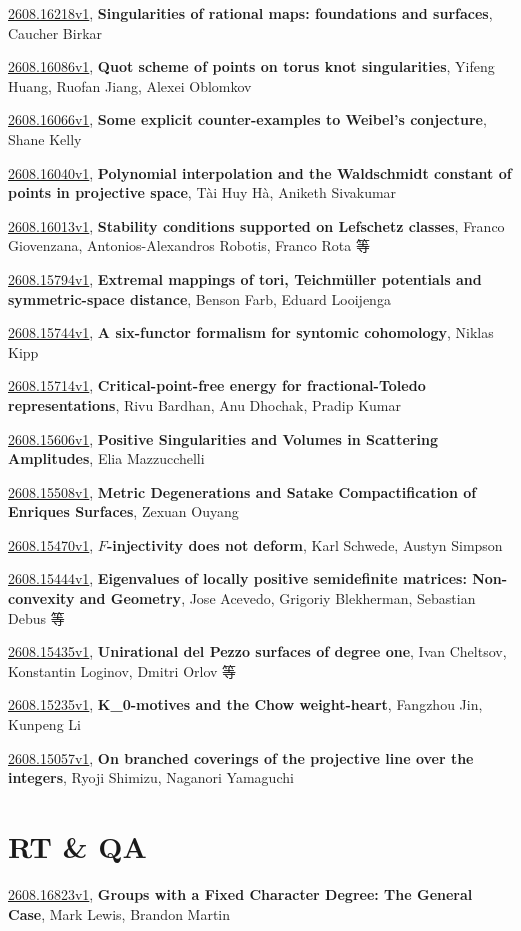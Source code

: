 \documentclass[9pt, a4paper]{article}
\theoremstyle{plain}
\theoremstyle{definition}
\theoremstyle{remark}
\newcommand{\arxiv}[3]{\href{https://arxiv.org/abs/#1}{#1}, \textbf{\textcolor{arxivblue}{#2}}, #3}
\begin{document}
\arxiv{2608.16218v1}{Singularities of rational maps: foundations and surfaces}{Caucher Birkar}

\arxiv{2608.16086v1}{Quot scheme of points on torus knot singularities}{Yifeng Huang, Ruofan Jiang, Alexei Oblomkov}

\arxiv{2608.16066v1}{Some explicit counter-examples to Weibel's conjecture}{Shane Kelly}

\arxiv{2608.16040v1}{Polynomial interpolation and the Waldschmidt constant of points in projective space}{Tài Huy Hà, Aniketh Sivakumar}

\arxiv{2608.16013v1}{Stability conditions supported on Lefschetz classes}{Franco Giovenzana, Antonios-Alexandros Robotis, Franco Rota 等}

\arxiv{2608.15794v1}{Extremal mappings of tori, Teichmüller potentials and symmetric-space distance}{Benson Farb, Eduard Looijenga}

\arxiv{2608.15744v1}{A six-functor formalism for syntomic cohomology}{Niklas Kipp}

\arxiv{2608.15714v1}{Critical-point-free energy for fractional-Toledo representations}{Rivu Bardhan, Anu Dhochak, Pradip Kumar}

\arxiv{2608.15606v1}{Positive Singularities and Volumes in Scattering Amplitudes}{Elia Mazzucchelli}

\arxiv{2608.15508v1}{Metric Degenerations and Satake Compactification of Enriques Surfaces}{Zexuan Ouyang}

\arxiv{2608.15470v1}{$F$-injectivity does not deform}{Karl Schwede, Austyn Simpson}

\arxiv{2608.15444v1}{Eigenvalues of locally positive semidefinite matrices: Non-convexity and Geometry}{Jose Acevedo, Grigoriy Blekherman, Sebastian Debus 等}

\arxiv{2608.15435v1}{Unirational del Pezzo surfaces of degree one}{Ivan Cheltsov, Konstantin Loginov, Dmitri Orlov 等}

\arxiv{2608.15235v1}{K_0-motives and the Chow weight-heart}{Fangzhou Jin, Kunpeng Li}

\arxiv{2608.15057v1}{On branched coverings of the projective line over the integers}{Ryoji Shimizu, Naganori Yamaguchi}


\section{RT \& QA}
\arxiv{2608.16823v1}{Groups with a Fixed Character Degree: The General Case}{Mark Lewis, Brandon Martin}
\end{document}
